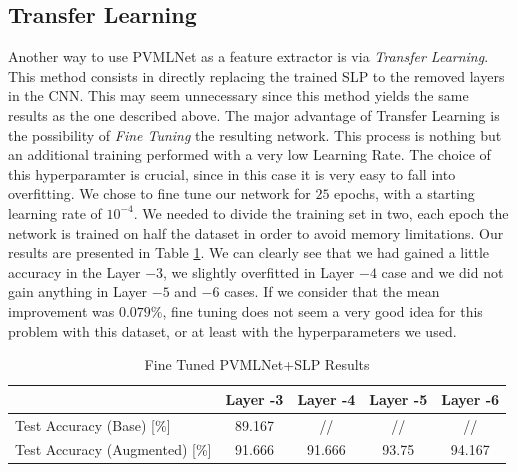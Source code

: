 \documentclass[10pt,a4paper]{report}
\begin{document}
\subsection{Transfer Learning}
Another way to use PVMLNet as a feature extractor is via \textit{Transfer Learning}. This method consists in directly replacing the trained SLP to the removed layers in the CNN. This may seem unnecessary since this method yields the same results as the one described above. The major advantage of Transfer Learning is the possibility of \textit{Fine Tuning} the resulting network. This process is nothing but an additional training performed with a very low Learning Rate. The choice of this hyperparamter is crucial, since in this case it is very easy to fall into overfitting. We chose to fine tune our network for $25$ epochs, with a starting learning rate of $10^{-4}$. We needed to divide the training set in two, each epoch the network is trained on half the dataset in order to avoid memory limitations. Our results are presented in Table \ref{tab:ftft-pvmlnet}. We can clearly see that we had gained a little accuracy in the Layer $-3$, we slightly overfitted in Layer $-4$ case and we did not gain anything in Layer $-5$ and $-6$ cases. If we consider that the mean improvement was $0.079 \%$, fine tuning does not seem a very good idea for this problem with this dataset, or at least with the hyperparameters we used. 
\begin{table}[!ht]
\centering
\begin{tabular}{|l|c|c|c|c|}
\hline
                                   & Layer -3 & Layer -4 & Layer -5 & Layer -6 \\ \hline
Test Accuracy (Base) {[}\%{]}      & 89.167   & //       & //       & //       \\ \hline
Test Accuracy (Augmented) {[}\%{]} & 91.666   & 91.666   & 93.75    & 94.167   \\ \hline
\end{tabular}
\caption{Fine Tuned PVMLNet+SLP Results}
\label{tab:ftft-pvmlnet}
\end{table} 
\end{document}
